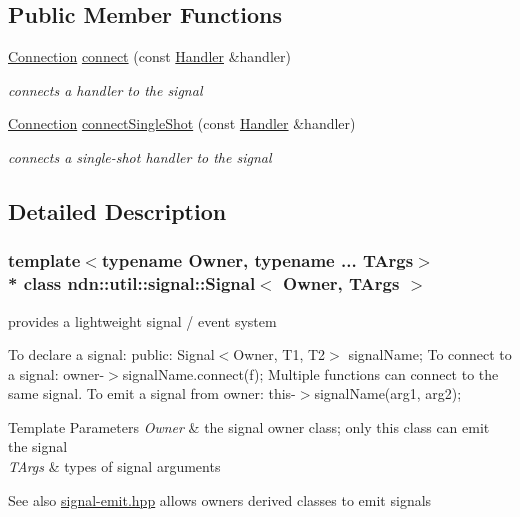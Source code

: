 \subsection*{Public Member Functions}
\begin{DoxyCompactItemize}
\item 
\hyperlink{classndn_1_1util_1_1signal_1_1Connection}{Connection} \hyperlink{classndn_1_1util_1_1signal_1_1Signal_a2797d4e1897c323a42bbecee4ded87ee}{connect} (const \hyperlink{classndn_1_1util_1_1signal_1_1Signal_a34d7bb02178bfbf9e624658d1920981c}{Handler} \&handler)
\begin{DoxyCompactList}\small\item\em connects a handler to the signal \end{DoxyCompactList}\item 
\hyperlink{classndn_1_1util_1_1signal_1_1Connection}{Connection} \hyperlink{classndn_1_1util_1_1signal_1_1Signal_aee89219a5d1c0bef794a512492d80769}{connect\+Single\+Shot} (const \hyperlink{classndn_1_1util_1_1signal_1_1Signal_a34d7bb02178bfbf9e624658d1920981c}{Handler} \&handler)
\begin{DoxyCompactList}\small\item\em connects a single-\/shot handler to the signal \end{DoxyCompactList}\end{DoxyCompactItemize}


\subsection{Detailed Description}
\subsubsection*{template$<$typename Owner, typename ... T\+Args$>$\\*
class ndn\+::util\+::signal\+::\+Signal$<$ Owner, T\+Args $>$}

provides a lightweight signal / event system 

To declare a signal\+: public\+: Signal$<$\+Owner, T1, T2$>$ signal\+Name; To connect to a signal\+: owner-\/$>$signal\+Name.\+connect(f); Multiple functions can connect to the same signal. To emit a signal from owner\+: this-\/$>$signal\+Name(arg1, arg2);


\begin{DoxyTemplParams}{Template Parameters}
{\em Owner} & the signal owner class; only this class can emit the signal \\
\hline
{\em T\+Args} & types of signal arguments \\
\hline
\end{DoxyTemplParams}
\begin{DoxySeeAlso}{See also}
\hyperlink{signal-emit_8hpp}{signal-\/emit.\+hpp} allows owner\textquotesingle{}s derived classes to emit signals 
\end{DoxySeeAlso}


